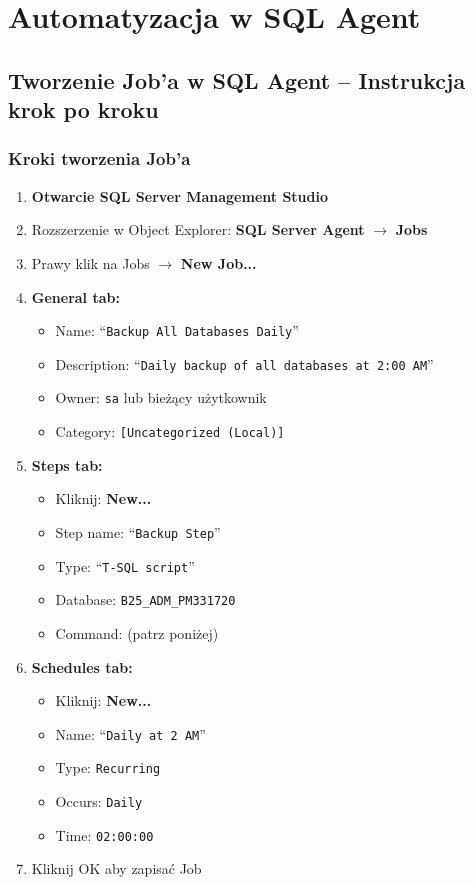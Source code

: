 \documentclass[a4paper,11pt]{article}
\begin{document}
	\section{Automatyzacja w SQL Agent}
	
	\subsection{Tworzenie Job'a w SQL Agent -- Instrukcja krok po kroku}
	
	\subsubsection{Kroki tworzenia Job'a}
	
	\begin{enumerate}
		\item \textbf{Otwarcie SQL Server Management Studio}
		\item Rozszerzenie w Object Explorer: \textbf{SQL Server Agent} $\rightarrow$ \textbf{Jobs}
		\item Prawy klik na Jobs $\rightarrow$ \textbf{New Job...}
		\item \textbf{General tab:}
		\begin{itemize}
			\item Name: ``\texttt{Backup All Databases Daily}''
			\item Description: ``\texttt{Daily backup of all databases at 2:00 AM}''
			\item Owner: \texttt{sa} lub bieżący użytkownik
			\item Category: \texttt{[Uncategorized (Local)]}
		\end{itemize}
		\item \textbf{Steps tab:}
		\begin{itemize}
			\item Kliknij: \textbf{New...}
			\item Step name: ``\texttt{Backup Step}''
			\item Type: ``\texttt{T-SQL script}''
			\item Database: \texttt{B25\_ADM\_PM331720}
			\item Command: (patrz poniżej)
		\end{itemize}
		\item \textbf{Schedules tab:}
		\begin{itemize}
			\item Kliknij: \textbf{New...}
			\item Name: ``\texttt{Daily at 2 AM}''
			\item Type: \texttt{Recurring}
			\item Occurs: \texttt{Daily}
			\item Time: \texttt{02:00:00}
		\end{itemize}
		\item Kliknij OK aby zapisać Job
	\end{enumerate}
	
\end{document}
